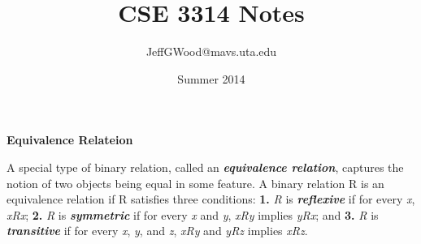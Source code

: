 \documentclass[a4paper,10pt]{article}
\title{CSE 3314 Notes}
\author{JeffGWood@mavs.uta.edu}
\date{Summer 2014}
\begin{document}
\textbf{Equivalence Relateion}\newline



 A special type of binary relation, called an \textbf{\textit{equivalence relation}}, captures the notion of two objects being equal in some feature. A binary relation R is an equivalence relation if R satisfies three conditions: 
\newline
\newline\textbf{1.} \textit{R} is \textbf{\textit{reflexive}} if for every \textit{x}, \textit{xRx};
\newline\textbf{2.} \textit{R} is \textbf{\textit{symmetric}} if for every \textit{x} and \textit{y}, \textit{xRy} implies \textit{yRx}; and
\newline\textbf{3.} \textit{R} is \textbf{\textit{transitive}} if for every \textit{x}, \textit{y}, and \textit{z}, \textit{xRy} and \textit{yRz} implies \textit{xRz}.





\end{document}
